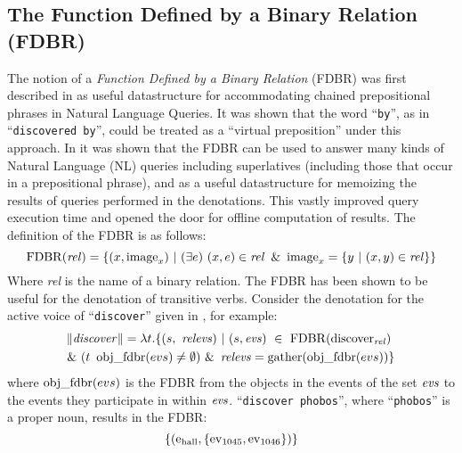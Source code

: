 \documentclass[../main.tex]{subfiles}
\begin{document}
\begin{refsection}
%
%

\subsection{The Function Defined by a Binary Relation (FDBR)}
\label{webist2020conf:fdbr}

The notion of a \textit{Function Defined by a Binary Relation} (FDBR) was first described in \cite{peelar2016accommodating} as useful datastructure for accommodating chained prepositional phrases in Natural Language Queries.  It was shown that the word ``\texttt{by}'', as in ``\texttt{discovered by}'', could be treated as a ``virtual preposition'' under this approach. In \cite{frostpeelar2019} it was shown that the FDBR can be used to answer many kinds of Natural Language (NL) queries including superlatives (including those that occur in a prepositional phrase), and as a useful datastructure for memoizing the results of queries performed in the denotations.  This vastly improved query execution time and opened the door for offline computation of results.
The definition of the FDBR is as follows:
\begin{equation*}
		\FDBR{\rel} = \{(x, \image_x)\ | \ (\exists e)\ (x, e) \in \rel\ \& \ \image_x = \{ y\ |\ (x, y) \in \rel \}  \}
\end{equation*}
Where \textit{rel} is the name of a binary relation.
The FDBR has been shown to be useful for the denotation of transitive verbs.  Consider the denotation for the active voice of ``\texttt{discover}'' given in \cite{peelar2020compositional}, for example:
\begin{multline*}
	\meaningof{discover} =
	\lambda t.\{ (s,\ \opit{relevs})\ |\ (s, \evs)\ \in\ \FDBR{\relation{discover}}\ \\
	\&\ (t\ \objfdbr{evs} \neq \emptyset)\ \&\ \opit{relevs} = \gatherevs{\objfdbr{evs}} \}
\end{multline*}
where $\operatorname{obj\_fdbr}({evs})$ is the FDBR from the objects in the events of the set $\operatorname{\mathit{evs}}$ to the events they participate in within $\operatorname{\mathit{evs}}$.  ``\texttt{discover phobos}'', where ``\texttt{phobos}'' is a proper noun, results in the FDBR:
\begin{equation*}
	\{(\entityassoc{\hall}, \{ \eventassoc{1045}, \eventassoc{1046} \})\}

\end{equation*}
\end{refsection}
\end{document}
